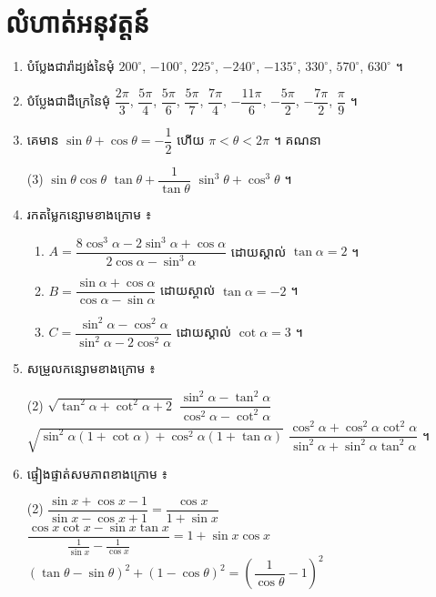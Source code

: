\section*{លំហាត់អនុវត្តន៍}
\begin{enumerate}[1]
  \item បំប្លែងជារ៉ាដ្យង់នៃមុំ $200^\circ$, $-100^\circ$, $225^\circ$, $-240^\circ$, $-135^\circ$, $330^\circ$, $570^\circ$, $630^\circ$ ។
  \item បំប្លែងជាដឺក្រេនៃមុំ $\dfrac{2\pi}{3}$, $\dfrac{5\pi}{4}$, $\dfrac{5\pi}{6}$, $\dfrac{5\pi}{7}$, $\dfrac{7\pi}{4}$, $-\dfrac{11\pi}{6}$, $-\dfrac{5\pi}{2}$, $-\dfrac{7\pi}{2}$, $\dfrac{\pi}{9}$ ។
  \item គេមាន $\sin\theta + \cos\theta = -\dfrac{1}{2}$ ហើយ $\pi < \theta < 2\pi$ ។ គណនា
  \begin{tasks}(3)
    \task $\sin\theta\cos\theta$
    \task $\tan\theta + \dfrac{1}{\tan\theta}$
    \task $\sin^3\theta + \cos^3\theta$ ។
  \end{tasks}
  \item រកតម្លៃកន្សោមខាងក្រោម ៖
  \begin{enumerate}[a]
    \item $A = \dfrac{8\cos^3\alpha - 2\sin^3\alpha + \cos\alpha}{2\cos\alpha - \sin^3\alpha}$ ដោយស្គាល់ $\tan\alpha = 2$ ។
    \item $B = \dfrac{\sin\alpha + \cos\alpha}{\cos\alpha - \sin\alpha}$ ដោយស្គាល់ $\tan\alpha = -2$ ។
    \item $C = \dfrac{\sin^2\alpha - \cos^2\alpha}{\sin^2\alpha - 2\cos^2\alpha}$ ដោយស្គាល់ $\cot\alpha = 3$ ។
  \end{enumerate}
  \item សម្រួលកន្សោមខាងក្រោម ៖
  \begin{tasks}(2)
    \task $\sqrt{\tan^2\alpha + \cot^2\alpha + 2}$
    \task $\dfrac{\sin^2\alpha - \tan^2\alpha}{\cos^2\alpha - \cot^2\alpha}$
    \task $\sqrt{\sin^2\alpha(1 + \cot\alpha) + \cos^2\alpha(1 + \tan\alpha)}$
    \task $\dfrac{\cos^2\alpha + \cos^2\alpha\cot^2\alpha}{\sin^2\alpha + \sin^2\alpha\tan^2\alpha}$ ។
  \end{tasks}
  \item ផ្ទៀងផ្ទាត់សមភាពខាងក្រោម ៖
  \begin{tasks}(2)
    \task $\dfrac{\sin x + \cos x - 1}{\sin x - \cos x + 1} = \dfrac{\cos x}{1 + \sin x}$
    \task $\dfrac{\cos x\cot x - \sin x\tan x}{\frac{1}{\sin x} - \frac{1}{\cos x}} = 1 + \sin x\cos x$
    \task $(\tan\theta - \sin\theta)^2 + (1 - \cos\theta)^2 = \left(\dfrac{1}{\cos\theta} - 1\right)^2$

\end{tasks}
\end{enumerate}
